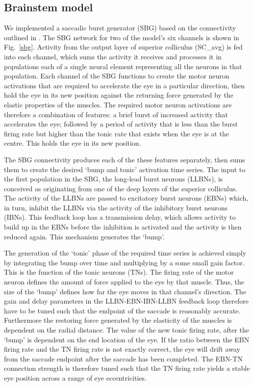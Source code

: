 \documentclass{frontiersSCNS}
\begin{document}
\subsection{Brainstem model}

We implemented a saccadic burst generator (SBG) based
on the connectivity outlined in \cite{gancarz_neural_1998}. The SBG network
for two of the model's
six channels is shown in Fig.~\ref{sbg}. Activity from the output
layer of superior colliculus (SC\_avg) is fed into each channel, which
sums the activity it receives and processes it in populations each of
a single neural element representing all the neurons in that
population. Each channel of the SBG functions to create the motor neuron
activations that are required to accelerate the eye in a particular
direction, then hold the eye in its new position against the returning
force generated by the elastic properties of the muscles.  The
required motor neuron activations are therefore a combination of features:
a brief burst of
increased activity that accelerates the eye; followed by a period
of activity that is less than the burst firing rate but higher than
the tonic rate that exists when the eye is at the centre. This
holds the eye in its new position.

The SBG connectivity produces each of the these features separately,
then sums them to create the desired `bump and tonic' activation
time series.  The input to the first population in the SBG, the
long-lead burst neurons (LLBNs), is conceived as originating from
one of the deep layers of the superior colliculus.  The activity
of the LLBNs are passed to excitatory burst neurons (EBNs) which,
in turn, inhibit the LLBNs via the activity of the inhibitory
burst neurons (IBNs).  This feedback loop has a transmission delay,
which allows activity to build up in the EBNs before the inhibition
is activated and the activity is then reduced again.  This mechanism
generates the `bump'.

The generation of the `tonic' phase of the required time series is
achieved simply by integrating the bump over time and multiplying by a
some small gain factor.  This is the function of the tonic neurons (TNs).
The firing rate of the motor neuron defines the amount of force applied
to the eye by that muscle.  Thus, the size of the `bump' defines how far
the eye moves in that channel's direction.  The gain and delay parameters
in the LLBN-EBN-IBN-LLBN feedback loop therefore have to be tuned such that
the endpoint of the saccade is reasonably accurate.  Furthermore the
restoring force generated by the elasticity of the muscles is dependent
on the radial distance.  The value of the new tonic firing rate, after
the `bump' is dependent on the end location of the eye.  If the ratio
between the EBN firing rate and the TN firing rate is not exactly
correct, the eye will drift away from the saccade endpoint after the
saccade has been completed.  The EBN-TN connection strength is
therefore tuned such that the TN firing rate yields a stable eye
position across a range of eye eccentricities.
\end{document}
